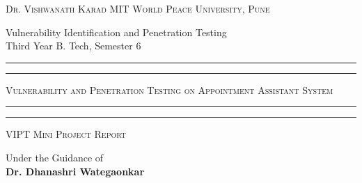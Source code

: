 \documentclass[openany]{report}
\begin{document}
\begin{titlepage}
    \centering


    \huge\textsc{
        Dr. Vishwanath Karad MIT World Peace University, Pune
    }\\

    \vspace{0.75\baselineskip} %

    \LARGE{
        Vulnerability Identification and Penetration Testing\\
        Third Year B. Tech, Semester 6\\
    }

    \vfill %


    \rule{\textwidth}{1.6pt}\vspace*{-\baselineskip}\vspace*{2pt}
    \rule{\textwidth}{0.6pt}
    \vspace{0.75\baselineskip} %



    \huge{\textsc{
            Vulnerability and Penetration Testing on Appointment Assistant System
        }} \\



    \vspace{0.5\baselineskip} %
    \rule{\textwidth}{0.6pt}\vspace*{-\baselineskip}\vspace*{2.8pt}
    \rule{\textwidth}{1.6pt}

    \vspace{1\baselineskip} %


    \LARGE\textsc{
        VIPT Mini Project Report
    } %


    \vspace{0.5\baselineskip} %
    Under the Guidance of\\
    \Large{
        \textbf{Dr. Dhanashri Wategaonkar}
    }
    \vfill


\end{titlepage}
\end{document}

